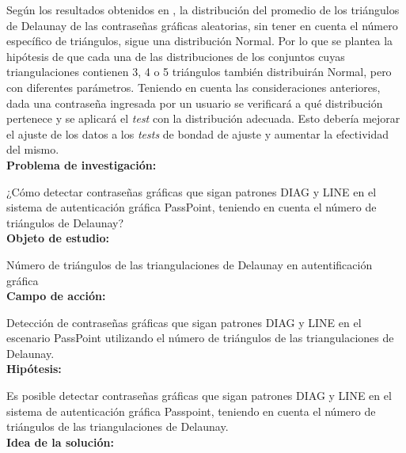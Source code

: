\documentclass[12pt]{report}
\begin{document}
	
	Según los resultados obtenidos en \cite{13}, la distribución del promedio de los triángulos de  Delaunay de las contraseñas gráficas aleatorias, sin tener en cuenta el número específico de triángulos, sigue una distribución Normal. Por lo que se plantea la hipótesis de que cada una de las distribuciones de los conjuntos cuyas triangulaciones contienen 3, 4 o 5 triángulos también distribuirán Normal, pero con diferentes parámetros. Teniendo en cuenta las consideraciones anteriores, dada una contraseña ingresada por un usuario se verificará a qué distribución pertenece y se aplicará el \textit{test} con la distribución adecuada. Esto debería mejorar el ajuste de los datos a los \textit{tests} de bondad de ajuste y aumentar la efectividad del mismo.\\
	
\large{\textbf{Problema de investigación:}}	

\normalsize{¿Cómo  detectar contraseñas gráficas que sigan patrones DIAG y LINE  en el sistema de autenticación gráfica PassPoint, teniendo en cuenta el número de triángulos de Delaunay?}\\
	
	\large{\textbf{Objeto de estudio:}}
	
	\normalsize{Número de triángulos de las  triangulaciones de Delaunay  en autentificación gráfica}\\
	
		   
	\large{\textbf{Campo de acción:}}
	
	\normalsize{Detección de contraseñas gráficas que sigan patrones DIAG y LINE en el escenario PassPoint   utilizando  el número de triángulos de las triangulaciones de Delaunay}.\\
	 
	\large{\textbf{Hipótesis:}}

	\normalsize{Es posible detectar contraseñas gráficas que sigan patrones DIAG y LINE en el sistema de autenticación gráfica Passpoint, teniendo en cuenta el número de triángulos  de las triangulaciones de Delaunay}.\\
		
	
	\large{\textbf{Idea de la solución:}}
	
\end{document}
